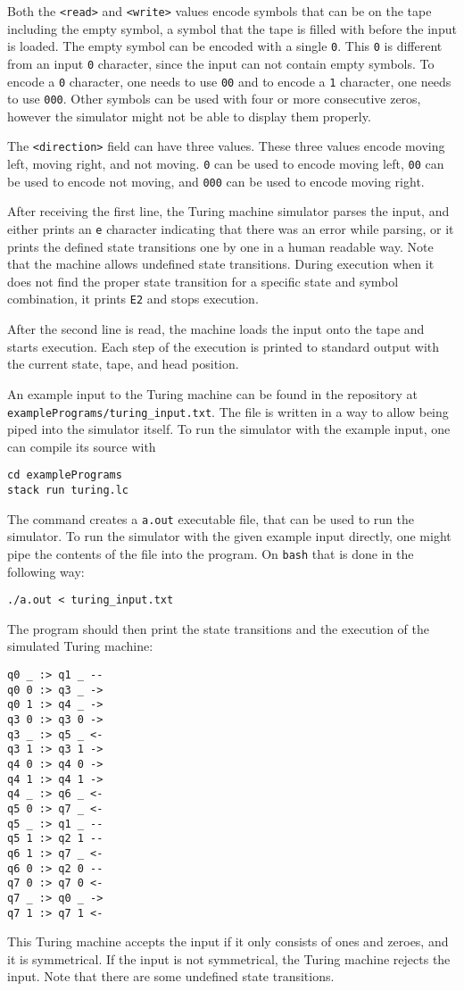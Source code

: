 \documentclass[12pt]{article}
\begin{document}
Both the \verb$<read>$ and \verb$<write>$ values encode symbols that can be on
the tape including the empty symbol, a symbol that the tape is filled with
before the input is loaded. The empty symbol can be encoded with a single
\verb$0$. This \verb$0$ is different from an input \verb$0$ character, since the
input can not contain empty symbols. To encode a \verb$0$ character, one needs
to use \verb$00$ and to encode a \verb$1$ character, one needs to use
\verb$000$. Other symbols can be used with four or more consecutive zeros,
however the simulator might not be able to display them properly.

The \verb$<direction>$ field can have three values. These three values encode
moving left, moving right, and not moving. \verb$0$ can be used to encode moving
left, \verb$00$ can be used to encode not moving, and \verb$000$ can be used to
encode moving right.

After receiving the first line, the Turing machine simulator parses the input,
and either prints an \verb$e$ character indicating that there was an error while
parsing, or it prints the defined state transitions one by one in a human
readable way. Note that the machine allows undefined state transitions. During
execution when it does not find the proper state transition for a specific state
and symbol combination, it prints \verb$E2$ and stops execution.

After the second line is read, the machine loads the input onto the tape and
starts execution. Each step of the execution is printed to standard output with
the current state, tape, and head position.

\lstset{frame=lines}

An example input to the Turing machine can be found in the repository at\\
\verb$examplePrograms/turing_input.txt$. The file is written in a way to allow
being piped into the simulator itself. To run the simulator with the example
input, one can compile its source with
\begin{lstlisting}
cd examplePrograms
stack run turing.lc
\end{lstlisting}
The command creates a \verb$a.out$ executable file, that can be used to run the
simulator. To run the simulator with the given example input directly, one might
pipe the contents of the file into the program. On \verb$bash$ that is done in
the following way:
\begin{lstlisting}
./a.out < turing_input.txt
\end{lstlisting}
The program should then print the state transitions and the execution of the 
simulated Turing machine:
\begin{lstlisting}
q0 _ :> q1 _ --
q0 0 :> q3 _ ->
q0 1 :> q4 _ ->
q3 0 :> q3 0 ->
q3 _ :> q5 _ <-
q3 1 :> q3 1 ->
q4 0 :> q4 0 ->
q4 1 :> q4 1 ->
q4 _ :> q6 _ <-
q5 0 :> q7 _ <-
q5 _ :> q1 _ --
q5 1 :> q2 1 --
q6 1 :> q7 _ <-
q6 0 :> q2 0 --
q7 0 :> q7 0 <-
q7 _ :> q0 _ ->
q7 1 :> q7 1 <-
\end{lstlisting}
This Turing machine accepts the input if it only consists of ones and zeroes,
and it is symmetrical. If the input is not symmetrical, the Turing machine
rejects the input. Note that there are some undefined state transitions.
\end{document}
